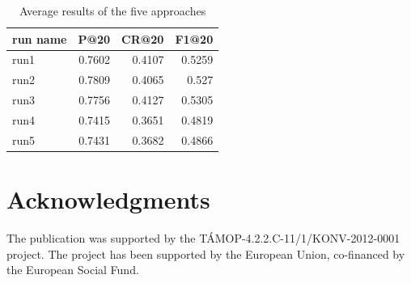 \documentclass{acm_proc_article-me}
\begin{document}
\begin{table}[t]
\centering
\caption{Average results of the five approaches}
\begin{tabular}{|l|r|r|r|}
	\hline 
	run name & P@20 & CR@20 & F1@20\tabularnewline
	\hline 
	\hline 
	run1 & 0.7602 & 0.4107 & 0.5259\tabularnewline
	\hline 
	run2 & 0.7809 & 0.4065 & 0.527\tabularnewline
	\hline 
	run3 & 0.7756 & 0.4127 & 0.5305\tabularnewline
	\hline 
	run4 & 0.7415 & 0.3651 & 0.4819\tabularnewline
	\hline 
	run5 & 0.7431 & 0.3682 & 0.4866\tabularnewline
	\hline 
\end{tabular}
\label{table:results}
\end{table}



\section{Acknowledgments}

The publication was supported by the T\'AMOP-4.2.2.C-11/1/KONV-2012-0001 project. The project has been supported by the European Union, co-financed by the European Social Fund.



\end{document}
